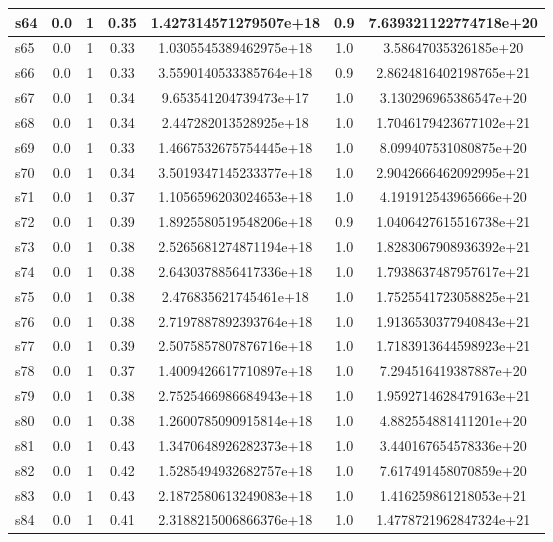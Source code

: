 \documentclass{article}
\begin{document}
\begin{tabular}{|l|c|c|c|c|c|c|}
s64 &0.0 & 1 & 0.35 & 1.427314571279507e+18 & 0.9 & 7.639321122774718e+20\\
\hline
s65 &0.0 & 1 & 0.33 & 1.0305545389462975e+18 & 1.0 & 3.58647035326185e+20\\
\hline
s66 &0.0 & 1 & 0.33 & 3.5590140533385764e+18 & 0.9 & 2.8624816402198765e+21\\
\hline
s67 &0.0 & 1 & 0.34 & 9.653541204739473e+17 & 1.0 & 3.130296965386547e+20\\
\hline
s68 &0.0 & 1 & 0.34 & 2.447282013528925e+18 & 1.0 & 1.7046179423677102e+21\\
\hline
s69 &0.0 & 1 & 0.33 & 1.4667532675754445e+18 & 1.0 & 8.099407531080875e+20\\
\hline
s70 &0.0 & 1 & 0.34 & 3.5019347145233377e+18 & 1.0 & 2.9042666462092995e+21\\
\hline
s71 &0.0 & 1 & 0.37 & 1.1056596203024653e+18 & 1.0 & 4.191912543965666e+20\\
\hline
s72 &0.0 & 1 & 0.39 & 1.8925580519548206e+18 & 0.9 & 1.0406427615516738e+21\\
\hline
s73 &0.0 & 1 & 0.38 & 2.5265681274871194e+18 & 1.0 & 1.8283067908936392e+21\\
\hline
s74 &0.0 & 1 & 0.38 & 2.6430378856417336e+18 & 1.0 & 1.7938637487957617e+21\\
\hline
s75 &0.0 & 1 & 0.38 & 2.476835621745461e+18 & 1.0 & 1.7525541723058825e+21\\
\hline
s76 &0.0 & 1 & 0.38 & 2.7197887892393764e+18 & 1.0 & 1.9136530377940843e+21\\
\hline
s77 &0.0 & 1 & 0.39 & 2.5075857807876716e+18 & 1.0 & 1.7183913644598923e+21\\
\hline
s78 &0.0 & 1 & 0.37 & 1.4009426617710897e+18 & 1.0 & 7.294516419387887e+20\\
\hline
s79 &0.0 & 1 & 0.38 & 2.7525466986684943e+18 & 1.0 & 1.9592714628479163e+21\\
\hline
s80 &0.0 & 1 & 0.38 & 1.2600785090915814e+18 & 1.0 & 4.882554881411201e+20\\
\hline
s81 &0.0 & 1 & 0.43 & 1.3470648926282373e+18 & 1.0 & 3.440167654578336e+20\\
\hline
s82 &0.0 & 1 & 0.42 & 1.5285494932682757e+18 & 1.0 & 7.617491458070859e+20\\
\hline
s83 &0.0 & 1 & 0.43 & 2.1872580613249083e+18 & 1.0 & 1.416259861218053e+21\\
\hline
s84 &0.0 & 1 & 0.41 & 2.3188215006866376e+18 & 1.0 & 1.4778721962847324e+21\\

\end{tabular}
\end{document}

